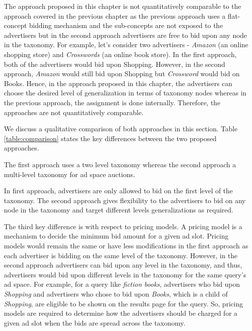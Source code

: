 The approach proposed in this chapter is not quantitatively comparable to the approach covered in the previous chapter as the previous approach uses a flat-concept bidding mechanism and the sub-concepts are not exposed to the advertisers but in the second approach advertisers are free to bid upon any node in the taxonomy. For example, let's consider two advertisers - \textit{Amazon} (an online shopping store) and \textit{Crosswords} (an online book store). In the first approach, both of the advertisers would bid upon Shopping. However, in the second approach, \textit{Amazon} would still bid upon Shopping but \textit{Crossword} would bid on Books. Hence, in the approach proposed in this chapter, the advertisers can choose the desired level of generalization in terms of taxonomy nodes whereas in the previous approach, the assignment is done internally. Therefore, the approaches are not quantitatively comparable. 

We discuss a qualitative comparison of both approaches in this section. Table \ref{table:comparison} states the key differences between the two proposed approaches. 

The first approach uses a two level taxonomy whereas the second approach a multi-level taxonomy for ad space auctions. 

In first approach, advertisers are only allowed to bid on the first level of the taxonomy. The second approach gives flexibility to the advertisers to bid on any node in the taxonomy and target different levels generalizations as required.





The third key difference is with respect to pricing models. A pricing model is a mechanism to decide the minimum bid amount for a given ad slot. Pricing models would remain the same or have less modifications in the first approach as each advertiser is bidding on the same level of the taxonomy. However, in the second approach advertisers can bid upon any level in the taxonomy, and thus, advertisers would bid upon different levels in the taxonomy for the same query's ad space. For example, for a query like \textit{fiction books}, advertisers who bid upon \textit{Shopping} and advertisers who chose to bid upon \textit{Books}, which is a child of \textit{Shopping}, are eligible to be shown on the results page for the query. So, pricing models are required to determine how the advertisers should be charged for a given ad slot when the bids are spread across the taxonomy.

